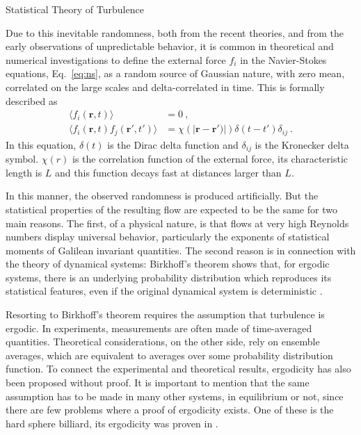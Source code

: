 \begin{chapter}{Statistical Theory of Turbulence}

Due to this inevitable randomness, both from the recent theories, and from the early observations of unpredictable behavior, it is common in theoretical and numerical investigations to define the external force $f_i$ in the Navier-Stokes equations, Eq.~\eqref{eq:ns}, as a random source of Gaussian nature, with zero mean, correlated on the large scales and delta-correlated in time. This is formally described as
\begin{equation}
\begin{split}
    \langle f_i(\mathbf{r},t) \rangle &= 0 \ , \\
    \langle f_i(\mathbf{r},t) f_j(\mathbf{r'},t') \rangle
    &= \chi(|\mathbf{r}-\mathbf{r'})|) \delta(t-t') \delta_{ij} \ .
\end{split}
\end{equation}
In this equation, $\delta(t)$ is the Dirac delta function
and $\delta_{ij}$ is the Kronecker delta symbol.
$\chi(r)$ is the correlation function of the external force, its characteristic
length is $L$ and this function decays fast at distances larger than $L$.

In this manner, the observed randomness is produced artificially.
But the statistical properties of the resulting flow
are expected to be the same for two main reasons.
The first, of a physical nature, is that flows at very high
Reynolds numbers display universal behavior, particularly the exponents of statistical moments of Galilean invariant quantities.
The second reason is in connection with the theory of dynamical
systems: Birkhoff's theorem shows that, for ergodic systems, there is
an underlying probability distribution which reproduces its
statistical features, even if the original dynamical system is deterministic \parencite{frisch1995,cornfeld2012ergodic}.

Resorting to Birkhoff's theorem requires the assumption that turbulence
is ergodic.
In experiments, measurements are often made
of time-averaged quantities. Theoretical considerations, on the other side,
rely on ensemble averages, which are equivalent to averages
over some probability distribution function. To connect the experimental
and theoretical results, ergodicity has also been proposed without proof.
It is important to mention that the same assumption has to be made in many other
systems, in equilibrium or not, since there are few
problems where a proof of ergodicity exists.
One of these is the hard sphere billiard, its ergodicity
was proven in \textcite{sinai1963}.


\end{chapter}
